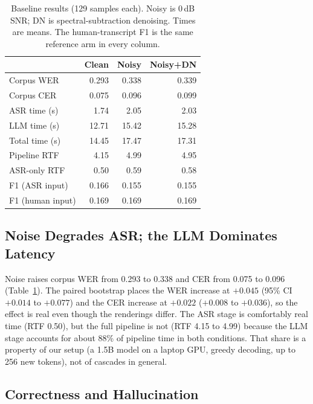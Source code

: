 \documentclass[11pt,a4paper,twocolumn]{article}
\begin{document}
\begin{table}[t]
\centering\footnotesize
\begin{tabular}{@{}lrrr@{}}
\toprule
 & \textbf{Clean} & \textbf{Noisy} & \textbf{Noisy+DN} \\
\midrule
Corpus WER & 0.293 & 0.338 & 0.339 \\
Corpus CER & 0.075 & 0.096 & 0.099 \\
ASR time (s) & 1.74 & 2.05 & 2.03 \\
LLM time (s) & 12.71 & 15.42 & 15.28 \\
Total time (s) & 14.45 & 17.47 & 17.31 \\
Pipeline RTF & 4.15 & 4.99 & 4.95 \\
ASR-only RTF & 0.50 & 0.59 & 0.58 \\
F1 (ASR input) & 0.166 & 0.155 & 0.155 \\
F1 (human input) & 0.169 & 0.169 & 0.169 \\
\bottomrule
\end{tabular}
\caption{Baseline results (129 samples each). Noisy is 0\,dB SNR; DN is spectral-subtraction denoising. Times are means. The human-transcript F1 is the same reference arm in every column.}
\label{tab:main}
\end{table}

\subsection{Noise Degrades ASR; the LLM Dominates Latency}

Noise raises corpus WER from 0.293 to 0.338 and CER from 0.075 to 0.096 (Table~\ref{tab:main}). The paired bootstrap places the WER increase at $+0.045$ (95\% CI $+0.014$ to $+0.077$) and the CER increase at $+0.022$ ($+0.008$ to $+0.036$), so the effect is real even though the renderings differ. The ASR stage is comfortably real time (RTF 0.50), but the full pipeline is not (RTF 4.15 to 4.99) because the LLM stage accounts for about 88\% of pipeline time in both conditions. That share is a property of our setup (a 1.5B model on a laptop GPU, greedy decoding, up to 256 new tokens), not of cascades in general.

\subsection{Correctness and Hallucination}
\end{document}
